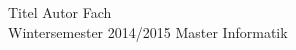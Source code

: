 



\createCoverAndTitlePage
{Titel}				%
{Autor}												%
{Fach \\Wintersemester 2014/2015}	  						%
{Master Informatik}											%
{}																%
{}																%
{}																%
{}											
	
% 									  													


%	  																							

